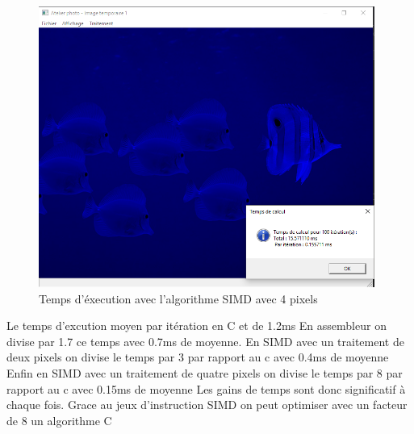 \documentclass[11pt]{report}
\begin{document}
\begin{figure}[h]
\includegraphics[width=11cm]{CaptureSimd4.PNG}
\caption{Temps d'éxecution avec l'algorithme SIMD avec 4 pixels}
\end{figure}

Le temps d'excution moyen par itération en C et de 1.2ms
En assembleur on divise par 1.7 ce temps avec 0.7ms de moyenne.
En SIMD avec un traitement de deux pixels on divise le temps par 3 par rapport au c avec 0.4ms de moyenne
Enfin en SIMD avec un traitement de quatre pixels on divise le temps par 8 par rapport au c avec 0.15ms de moyenne
Les gains de temps sont donc significatif à chaque fois. Grace au jeux d'instruction SIMD on peut optimiser avec un facteur de 8 un algorithme C
\end{document}
